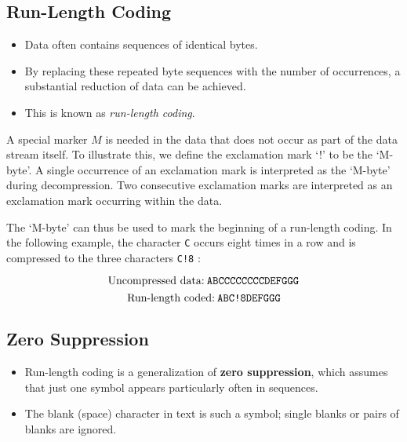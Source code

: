 %

\subsection{Run-Length Coding}
\begin{itemize}
	\item Data often contains sequences of identical bytes. 
	\item By replacing these repeated byte sequences with the number of occurrences, a substantial reduction of data can be	achieved. 
	\item This is known as \textit{run-length coding}. 
\end{itemize}


A special marker $ M $ is needed in the data that does not occur as part of the data stream itself. 
To illustrate this, we define the exclamation mark `!' to be the `M-byte'. A single occurrence of an exclamation mark is interpreted as the `M-byte' during decompression. Two consecutive exclamation marks are interpreted as an exclamation mark occurring within the data.

The `M-byte' can thus be used to mark the beginning of a run-length coding. In the following example, the character \verb|C| occurs eight times in a row and is compressed to the three characters \verb|C!8| :

\[ \textrm{Uncompressed data:}\: \verb|ABCCCCCCCCDEFGGG|\]
\[ \textrm{Run-length coded:}\: \verb|ABC!8DEFGGG|\]


\subsection{Zero Suppression}
\begin{itemize}
	\item Run-length coding is a generalization of \textbf{zero suppression}, which assumes that just one symbol appears particularly often in sequences. 
	\item The blank (space) character in text is such a symbol; single blanks or pairs of blanks are ignored. 
\end{itemize}


